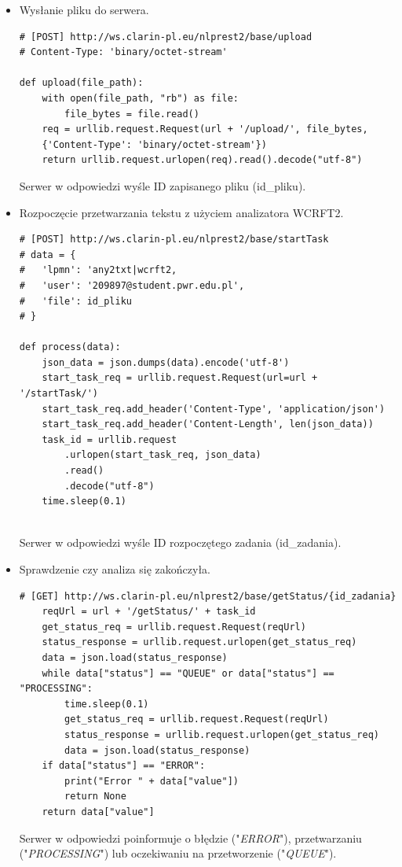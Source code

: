 \begin{itemize}
 \setlength\itemsep{2em}
\item Wysłanie pliku do serwera.
\begin{lstlisting}[style=pythonStyle]
# [POST] http://ws.clarin-pl.eu/nlprest2/base/upload
# Content-Type: 'binary/octet-stream'

def upload(file_path):
    with open(file_path, "rb") as file:
        file_bytes = file.read()
    req = urllib.request.Request(url + '/upload/', file_bytes, 
    {'Content-Type': 'binary/octet-stream'})
    return urllib.request.urlopen(req).read().decode("utf-8")

\end{lstlisting}
Serwer w odpowiedzi wyśle ID zapisanego pliku (id\_pliku).

\item Rozpoczęcie przetwarzania tekstu z użyciem analizatora WCRFT2.
\begin{lstlisting}[style=pythonStyle]
# [POST] http://ws.clarin-pl.eu/nlprest2/base/startTask
# data = { 
#	'lpmn': 'any2txt|wcrft2, 
#	'user': '209897@student.pwr.edu.pl', 
#	'file': id_pliku 
# }

def process(data):
    json_data = json.dumps(data).encode('utf-8')
    start_task_req = urllib.request.Request(url=url + '/startTask/')
    start_task_req.add_header('Content-Type', 'application/json')
    start_task_req.add_header('Content-Length', len(json_data))
    task_id = urllib.request
        .urlopen(start_task_req, json_data)
        .read()
        .decode("utf-8")
    time.sleep(0.1)
    
\end{lstlisting}
Serwer w odpowiedzi wyśle ID rozpoczętego zadania (id\_zadania).

\item Sprawdzenie czy analiza się zakończyła.
\begin{lstlisting}[style=pythonStyle]
# [GET] http://ws.clarin-pl.eu/nlprest2/base/getStatus/{id_zadania}   
    reqUrl = url + '/getStatus/' + task_id
    get_status_req = urllib.request.Request(reqUrl)
    status_response = urllib.request.urlopen(get_status_req)
    data = json.load(status_response)
    while data["status"] == "QUEUE" or data["status"] == "PROCESSING":
        time.sleep(0.1)
        get_status_req = urllib.request.Request(reqUrl)
        status_response = urllib.request.urlopen(get_status_req)
        data = json.load(status_response)
    if data["status"] == "ERROR":
        print("Error " + data["value"])
        return None
    return data["value"]
\end{lstlisting}
Serwer w odpowiedzi poinformuje o błędzie ("\textit{ERROR}"), przetwarzaniu ("\textit{PROCESSING}") lub oczekiwaniu na przetworzenie ("\textit{QUEUE}").


\end{itemize}
